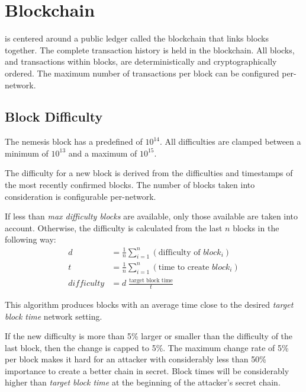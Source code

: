 \section{Blockchain}
\label{sec:blockchain}

\nemquote{
}{}

\codenamespace is centered around a public ledger called the blockchain that links blocks together.
The complete transaction history is held in the blockchain.
All blocks, and transactions within blocks, are deterministically and cryptographically ordered.
The maximum number of transactions per block can be configured per-network.

\subsection{Block Difficulty}
\label{sec:blockDifficulty}

The nemesis block has a predefined  of $10^{14}$.
All difficulties are clamped between a minimum of $10^{13}$ and a maximum of $10^{15}$.

The difficulty for a new block is derived from the difficulties and timestamps of the most recently confirmed blocks.
The number of blocks taken into consideration is configurable per-network.

If less than \textit{max difficulty blocks} are available, only those available are taken into account.
Otherwise, the difficulty is calculated from the last $n$ blocks in the following way:
\begin{align*}
\tag{average difficulty} d &= \frac{1}{n}\sum_{i=1}^n (\text{difficulty of $block_i$}) \\
\tag{average creation time} t &= \frac{1}{n}\sum_{i=1}^n (\text{time to create $block_i$}) \\
\tag{new difficulty} \mathit{difficulty} &= d \; \frac{\text{target block time}}{t}
\end{align*}

This algorithm produces blocks with an average time close to the desired \textit{target block time} network setting.

If the new difficulty is more than 5\% larger or smaller than the difficulty of the last block, then the change is capped to 5\%.
The maximum change rate of 5\% per block makes it hard for an attacker with considerably less than 50\% importance to create a better chain in secret.
Block times will be considerably higher than \textit{target block time} at the beginning of the attacker's secret chain.

